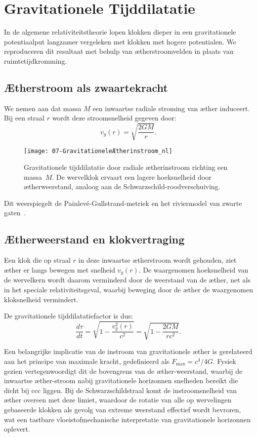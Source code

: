 \section{Gravitationele Tijddilatatie}

In de algemene relativiteitstheorie lopen klokken dieper in een gravitationele potentiaalput langzamer vergeleken met klokken met hogere potentialen. We reproduceren dit resultaat met behulp van ætherstroomvelden in plaats van ruimtetijdkromming.

\subsection*{Ætherstroom als zwaartekracht}

We nemen aan dat massa $M$ een inwaartse radiale stroming van æther induceert. Bij een straal $r$ wordt deze stroomsnelheid gegeven door:
\[
    v_g(r) = \sqrt{\frac{2GM}{r}}.
\]

\begin{figure}[htbp]
    \centering
    \texttt{[image: 07-GravitationeleÆtherinstroom\_nl]}
    \caption{Gravitationele tijddilatatie door radiale ætherinstroom richting een massa~$M$. De wervelklok ervaart een lagere hoeksnelheid door ætherweerstand, analoog aan de Schwarzschild-roodverschuiving.}
    \label{fig:GravitationeleÆtherinstroom}
\end{figure}

Dit weerspiegelt de Painlevé-Gullstrand-metriek en het riviermodel van zwarte gaten~\cite{Hamilton2004-river}.

\subsection*{Ætherweerstand en klokvertraging}

Een klok die op straal $r$ in deze inwaartse ætherstroom wordt gehouden, ziet æther er langs bewegen met snelheid $v_g(r)$. De waargenomen hoeksnelheid van de wervelkern wordt daarom verminderd door de weerstand van de æther, net als in het speciale relativiteitsgeval, waarbij beweging door de æther de waargenomen kloksnelheid vermindert.

De gravitationele tijddilatatiefactor is dus:
\[
    \frac{d\tau}{dt} = \sqrt{1 - \frac{v_g^2(r)}{c^2}} = \sqrt{1 - \frac{2GM}{rc^2}}. \tag{4}
\]

Een belangrijke implicatie van de instroom van gravitationele æther is gerelateerd aan het principe van maximale kracht, gedefinieerd als $F_\text{max} = c^4 /4G$. Fysiek gezien vertegenwoordigt dit de bovengrens van de æther-weerstand, waarbij de inwaartse æther-stroom nabij gravitationele horizonnen snelheden bereikt die dicht bij ccc liggen. Bij de Schwarzschildstraal komt de instroomsnelheid van æther overeen met deze limiet, waardoor de rotatie van alle op wervelingen gebaseerde klokken als gevolg van extreme weerstand effectief wordt bevroren, wat een tastbare vloeistofmechanische interpretatie van gravitationele horizonnen oplevert.

